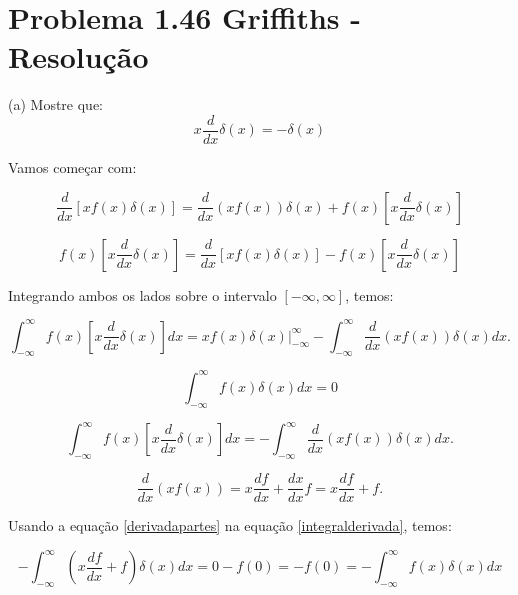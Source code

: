 \documentclass[a4paper,12pt]{article}
\begin{document}
\section*{Problema 1.46 Griffiths - Resolu\c{c}\~ao}


(a) Mostre que:
\begin{equation}
    x \frac{d}{d x} \delta(x)=-\delta(x)
\end{equation}

Vamos come\c{c}ar com:

\begin{equation}
\frac{d}{dx}\left[ xf(x)\delta(x)\right] = \frac{d}{dx}\left( xf(x) \right)\delta(x) + f(x)\left[ x\frac{d}{dx}\delta(x)\right]
\end{equation}

\begin{equation}
    f(x)\left[ x\frac{d}{dx}\delta(x)\right] = \frac{d}{dx}\left[ xf(x)\delta(x)\right] - f(x)\left[ x\frac{d}{dx}\delta(x)\right]
\end{equation}

Integrando ambos os lados sobre o intervalo $[-\infty,\infty]$, temos:


\begin{equation}
    \int_{-\infty}^{\infty} f(x)\left[x \frac{d}{d x} \delta(x)\right] d x=\left.x f(x) \delta(x)\right|_{-\infty} ^{\infty}-\int_{-\infty}^{\infty} \frac{d}{d x}(x f(x)) \delta(x) d x.    
\end{equation}

\begin{equation}
    \int_{-\infty}^{\infty} f(x) \delta(x) d x=0
\end{equation}

\begin{equation}\label{integralderivada}
    \int_{-\infty}^{\infty} f(x)\left[x \frac{d}{d x} \delta(x)\right] d x= -\int_{-\infty}^{\infty} \frac{d}{d x}(x f(x)) \delta(x) d x.    
\end{equation}

\begin{equation}\label{derivadapartes}
    \boxed{
    \frac{d}{d x}(x f(x))=x \frac{d f}{d x}+\frac{d x}{d x} f=x \frac{d f}{d x}+f.
    }
\end{equation}

Usando a equação \ref{derivadapartes} na equação \ref{integralderivada}, temos:

\begin{equation}
    -\int_{-\infty}^{\infty}\left(x \frac{d f}{d x}+f\right) \delta(x) d x=0-f(0)=-f(0)=-\int_{-\infty}^{\infty} f(x) \delta(x) d x
\end{equation}
\end{document}
